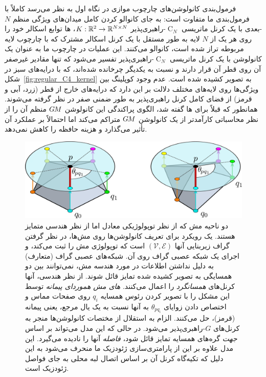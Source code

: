 فرمول‌بندی کانولوشن‌های چارچوب موازی در نگاه اول به نظر می‌رسد کاملاً با فرمول‌بندی ما متفاوت است:
به جای کانوالو کردن کامل میدان‌های ویژگی منظم $N$-بعدی با یک کرنل ماتریسی $\operatorname{C}_N$-راهبری‌پذیر ${K: \mathbb{R}^2 \to \mathbb{R}^{N\times N}}$،
ها توابع اسکالر خود را روی هر یک از $N$ لایه به طور مستقل با یک کرنل اسکالر مشترک که با چارچوب لایه مربوطه تراز شده است، کانوالو می‌کنند.
این عملیات در چارچوب ما به عنوان یک کانولوشن با یک کرنل ماتریسی $\operatorname{C}_N$-راهبری‌پذیر تفسیر می‌شود که تنها مقادیر غیرصفر آن روی قطر آن قرار دارند و نسبت به یکدیگر چرخانده شده‌اند، که با درایه‌های سبز در شکل~\ref{fig:regular_C4_kernel} به تصویر کشیده شده است.
عدم وجود کوپلینگ بین ویژگی‌ها روی لایه‌های مختلف دلالت بر این دارد که درایه‌های خارج از قطر (زرد، آبی و قرمز) از فضای کامل کرنل راهبری‌پذیر به طور ضمنی صفر در نظر گرفته می‌شوند.
همانطور که قبلاً برای ها گفته شد، الگوی پراکندگی این کانولوشن $G\mkern-1.4muM$ منظم آن را از نظر محاسباتی کارآمدتر از یک کانولوشن $G\mkern-1.4muM$ متراکم می‌کند اما احتمالاً بر عملکرد آن تأثیر می‌گذارد و هزینه حافظه را کاهش نمی‌دهد.






\begin{figure}
    \centering
    \includegraphics[width=.7\columnwidth]{figures/mesh_CNN_neighborhood_geometry.pdf}
    \vspace*{1ex}
    \caption{\small
        دو ناحیه مش که از نظر توپولوژیکی معادل اما از نظر هندسی متمایز هستند.
        یک رویکرد برای تعریف کانولوشن‌ها روی مش‌ها، در نظر گرفتن گراف زیربنایی آنها $(\mathcal{V},\mathcal{E})$ است که توپولوژی مش را ثبت می‌کند، و اجرای یک شبکه عصبی گراف روی آن.
        شبکه‌های عصبی گراف (متعارف) به دلیل نداشتن اطلاعات در مورد هندسه مش، نمی‌توانند بین دو همسایگی به تصویر کشیده شده تمایز قائل شوند.
        از نظر هندسی، آنها کرنل‌های \emph{همسانگرد} را اعمال می‌کنند.
        \emph{های مش هموردای پیمانه} توسط \citet{deHaan2020meshCNNs} این مشکل را با تصویر کردن رئوس همسایه $q_i$ روی صفحات مماس و اختصاص دادن زوایای $\theta_{pq_i}$ به آنها نسبت به یک یال مرجع، یعنی پیمانه (قرمز)، حل می‌کنند.
        الزام به استقلال از مختصات کانولوشن‌ها منجر به کرنل‌های $G$-راهبری‌پذیر می‌شود.
        در حالی که این مدل می‌تواند بر اساس \emph{جهت} گره‌های همسایه تمایز قائل شود، \emph{فاصله} آنها را نادیده می‌گیرد.
        این مدل علاوه بر این از پارامتری‌سازی ژئودزیک ما منحرف می‌شود به این دلیل که تکیه‌گاه کرنل آن بر اساس اتصال لبه محلی به جای فواصل ژئودزیک است.
    }
    \label{fig:mesh_CNNs_neighborhood}
\end{figure}


